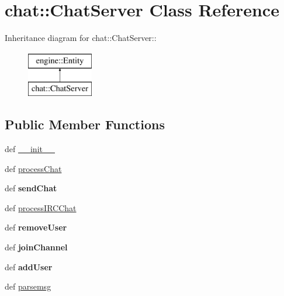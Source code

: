 \hypertarget{classchat_1_1ChatServer}{
\section{chat::ChatServer Class Reference}
\label{classchat_1_1ChatServer}
}
Inheritance diagram for chat::ChatServer::\begin{figure}[H]
\begin{center}
\leavevmode
\includegraphics[height=2cm]{classchat_1_1ChatServer}
\end{center}
\end{figure}
\subsection*{Public Member Functions}
\begin{DoxyCompactItemize}
\item 
def \hyperlink{classchat_1_1ChatServer_a983f009344e16e16bd811b941ef43e48}{\_\-\_\-init\_\-\_\-}
\item 
def \hyperlink{classchat_1_1ChatServer_a7f0db34ae9aae25478664ce7395b11f3}{processChat}
\item 
\hypertarget{classchat_1_1ChatServer_a7d952b71aac4056ee37c9fcabf0977be}{
def {\bfseries sendChat}}
\label{classchat_1_1ChatServer_a7d952b71aac4056ee37c9fcabf0977be}

\item 
def \hyperlink{classchat_1_1ChatServer_a3155b5a8e4933d9dffbfdd7ccdc5c162}{processIRCChat}
\item 
\hypertarget{classchat_1_1ChatServer_a29f5cbdb203803d78e0bd93b9a0a5190}{
def {\bfseries removeUser}}
\label{classchat_1_1ChatServer_a29f5cbdb203803d78e0bd93b9a0a5190}

\item 
\hypertarget{classchat_1_1ChatServer_afd5d201c2cfdfd826c7bb92ee4c08477}{
def {\bfseries joinChannel}}
\label{classchat_1_1ChatServer_afd5d201c2cfdfd826c7bb92ee4c08477}

\item 
\hypertarget{classchat_1_1ChatServer_a85588411071687dabfbfa9a77d6d1149}{
def {\bfseries addUser}}
\label{classchat_1_1ChatServer_a85588411071687dabfbfa9a77d6d1149}

\item 
def \hyperlink{classchat_1_1ChatServer_a2608f0b49950c686ee1c1ffc17e4ddfd}{parsemsg}
\end{DoxyCompactItemize}
